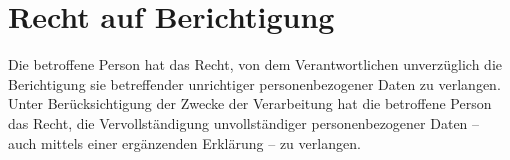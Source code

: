 \chapter{Recht auf Berichtigung}
\label{ch:16}


Die betroffene Person hat das Recht, von dem Verantwortlichen unverzüglich die Berichtigung sie betreffender unrichtiger
personenbezogener Daten zu verlangen. Unter Berücksichtigung der Zwecke der Verarbeitung hat die betroffene Person das
Recht, die Vervollständigung unvollständiger personenbezogener Daten -- auch mittels einer ergänzenden Erklärung -- zu
verlangen.


